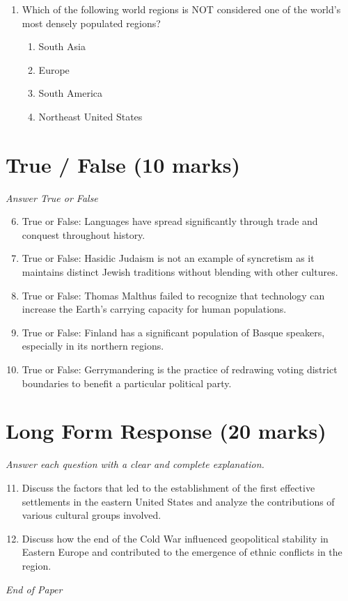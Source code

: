 \documentclass[12pt]{article}
\begin{document}
\begin{enumerate}[label=\arabic*.]
\begin{enumerate}[label=(\alph*)]
    \item World cities are found only in the northern and western hemispheres.
\end{enumerate}
\item Which of the following world regions is NOT considered one of the world's most densely populated regions?
\begin{enumerate}[label=(\alph*)]
    \item South Asia
    \item Europe
    \item South America
    \item Northeast United States
\end{enumerate}
\end{enumerate}

\section*{True / False (10 marks)}
\textit{Answer True or False}
\begin{enumerate}[label=\arabic*.]
\setcounter{enumi}{5}
\item True or False: Languages have spread significantly through trade and conquest throughout history.
\item True or False: Hasidic Judaism is not an example of syncretism as it maintains distinct Jewish traditions without blending with other cultures.
\item True or False: Thomas Malthus failed to recognize that technology can increase the Earth's carrying capacity for human populations.
\item True or False: Finland has a significant population of Basque speakers, especially in its northern regions.
\item True or False: Gerrymandering is the practice of redrawing voting district boundaries to benefit a particular political party.
\end{enumerate}

\section*{Long Form Response (20 marks)}
\textit{Answer each question with a clear and complete explanation.}
\begin{enumerate}[label=\arabic*.]
\setcounter{enumi}{10}
\item Discuss the factors that led to the establishment of the first effective settlements in the eastern United States and analyze the contributions of various cultural groups involved.
\item Discuss how the end of the Cold War influenced geopolitical stability in Eastern Europe and contributed to the emergence of ethnic conflicts in the region.
\end{enumerate}

\vfill
\noindent\textit{End of Paper}
\end{document}
